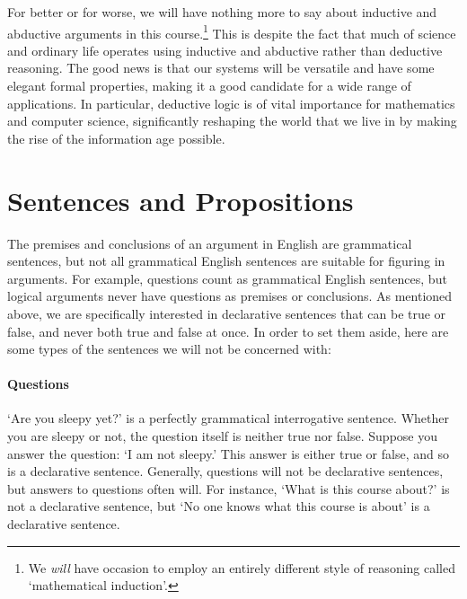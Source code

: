For better or for worse, we will have nothing more to say about inductive and abductive arguments in this course.\footnote{We \textit{will} have occasion to employ an entirely different style of reasoning called `mathematical induction'.}
This is despite the fact that much of science and ordinary life operates using inductive and abductive rather than deductive reasoning.
The good news is that our systems will be versatile and have some elegant formal properties, making it a good candidate for a wide range of applications.
In particular, deductive logic is of vital importance for mathematics and computer science, significantly reshaping the world that we live in by making the rise of the information age possible.






\section{Sentences and Propositions}
\label{intro.sentences}

The premises and conclusions of an argument in English are grammatical sentences, but not all grammatical English sentences are suitable for figuring in arguments.
For example, questions count as grammatical English sentences, but logical arguments never have questions as premises or conclusions.
As mentioned above, we are specifically interested in declarative sentences that can be true or false, and never both true and false at once.
In order to set them aside, here are some types of the sentences we will not be concerned with:

\paragraph{Questions} `Are you sleepy yet?' is a perfectly grammatical interrogative sentence.
Whether you are sleepy or not, the question itself is neither true nor false.
Suppose you answer the question: `I am not sleepy.'
This answer is either true or false, and so is a declarative sentence.
Generally, questions will not be declarative sentences, but answers to questions often will. 
For instance, `What is this course about?' is not a declarative sentence, but `No one knows what this course is about' is a declarative sentence.


